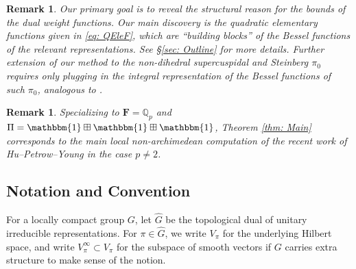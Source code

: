 \documentclass[A4]{amsart}
\newtheorem{remark} [theorem] {Remark}
\numberwithin{equation}{section} \everymath{\displaystyle}
\newcommand{\id}{\mathbbm{1}}
\newcommand{\Q}{\mathbb{Q}}
\newcommand{\F}{\mathbf{F}}
\begin{document}
\begin{remark}
	Our primary goal is to \emph{reveal the structural reason} for the bounds of the dual weight functions. Our main discovery is the \emph{quadratic elementary functions} given in \eqref{eq: QEleF}, which are ``building blocks'' of the Bessel functions of the relevant representations. See \S \ref{sec: Outline} for more details. Further extension of our method to the non-dihedral supercuspidal and Steinberg $\pi_0$ requires only plugging in the integral representation of the Bessel functions of such $\pi_0$, analogous to \cite[Theorem 1.6]{Wu24+}.
\end{remark}

\begin{remark}
	Specializing to $\F = \Q_p$ and $\Pi = \id \boxplus \id \boxplus \id$, Theorem \ref{thm: Main} corresponds to the main local non-archimedean computation of the recent work of Hu--Petrow--Young \cite{HPY25+} in the case $p \neq 2$.
\end{remark}


	\subsection{Notation and Convention}
	
	For a locally compact group $G$, let $\widehat{G}$ be the topological dual of unitary irreducible representations. For $\pi \in \widehat{G}$, we write $V_{\pi}$ for the underlying Hilbert space, and write $V_{\pi}^{\infty} \subset V_{\pi}$ for the subspace of smooth vectors if $G$ carries extra structure to make sense of the notion.
	
\end{document}
